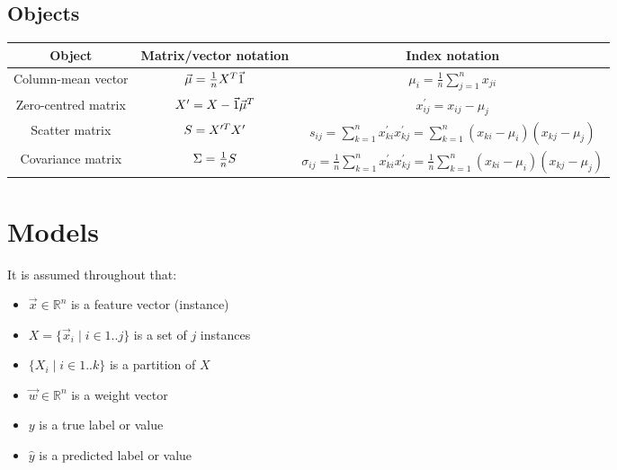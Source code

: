 \documentclass[a4paper]{extarticle}
\begin{document}
\begin{landscape}
  \section{Objects}

  \begin{center}
    \begin{tabular}{ccc}
      Object
       & Matrix/vector notation
       & Index notation
      \\
      \hline
      Column-mean vector
       & $\vec{\mu} = \frac{1}{n} X^{T} \vec{1}$
       & $\mu_{i} = \frac{1}{n} \sum_{j = 1}^{n} x_{ji}$
      \\
      Zero-centred matrix
       & $X^{\prime} = X - \vec{1} \vec{\mu}^{T}$
       & $x_{ij}^{\prime} = x_{ij} - \mu_{j}$
      \\
      Scatter matrix
       & $S = X^{\prime T} X^{\prime}$
       & $s_{ij} = \sum_{k = 1}^{n} x_{ki}^{\prime} x_{kj}^{\prime} = \sum_{k = 1}^{n} (x_{ki} - \mu_{i}) (x_{kj} - \mu_{j}) $
      \\
      Covariance matrix
       & $\Sigma = \frac{1}{n} S$
       & $\sigma_{ij} = \frac{1}{n} \sum_{k = 1}^{n} x_{ki}^{\prime} x_{kj}^{\prime} = \frac{1}{n} \sum_{k = 1}^{n} (x_{ki} - \mu_{i}) (x_{kj} - \mu_{j})$
      \\
    \end{tabular}
  \end{center}
\end{landscape}

\section{Models}

It is assumed throughout that:

\begin{itemize}
  \item $\vec{x} \in \mathbb{R}^{n}$ is a feature vector (instance)
  \item $X = \{ \vec{x}_{i} \mid i \in 1 .. j \}$ is a set of $j$ instances
  \item $\{ X_{i} \mid i \in 1 .. k \}$ is a partition of $X$
  \item $\vec{w} \in \mathbb{R}^{n}$ is a weight vector
  \item $y$ is a true label or value
  \item $\hat{y}$ is a predicted label or value
\end{itemize}
\end{document}
